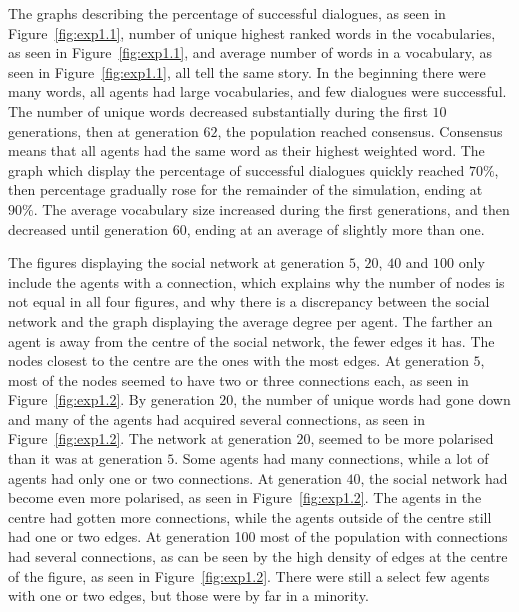 The graphs describing the percentage of successful dialogues, as seen in Figure~\ref{fig:exp1.1}, number of unique highest ranked words in the vocabularies, as seen in Figure~\ref{fig:exp1.1}, and average number of words in a vocabulary, as seen in Figure~\ref{fig:exp1.1}, all tell the same story. In the beginning there were many words, all agents had large vocabularies, and few dialogues were successful. The number of unique words decreased substantially during the first $10$ generations, then at generation $62$, the population reached consensus. Consensus means that all agents had the same word as their highest weighted word. The graph which display the percentage of successful dialogues quickly reached $70\%$, then percentage gradually rose for the remainder of the simulation, ending at $90\%$. The average vocabulary size increased during the first generations, and then decreased until generation $60$, ending at an average of slightly more than one.

The figures displaying the social network at generation $5$, $20$, $40$ and $100$ only include the agents with a connection, which explains why the number of nodes is not equal in all four figures, and why there is a discrepancy between the social network and the graph displaying the average degree per agent. The farther an agent is away from the centre of the social network, the fewer edges it has. The nodes closest to the centre are the ones with the most edges. At generation $5$, most of the nodes seemed to have two or three connections each, as seen in Figure~\ref{fig:exp1.2}. By generation $20$, the number of unique words had gone down and many of the agents had acquired several connections, as seen in Figure~\ref{fig:exp1.2}. The network at generation $20$, seemed to be more polarised than it was at generation $5$. Some agents had many connections, while a lot of agents had only one or two connections. At generation $40$, the social network had become even more polarised, as seen in Figure~\ref{fig:exp1.2}. The agents in the centre had gotten more connections, while the agents outside of the centre still had one or two edges. At generation 100 most of the population with connections had several connections, as can be seen by the high density of edges at the centre of the figure, as seen in Figure~\ref{fig:exp1.2}. There were still a select few agents with one or two edges, but those were by far in a minority.

